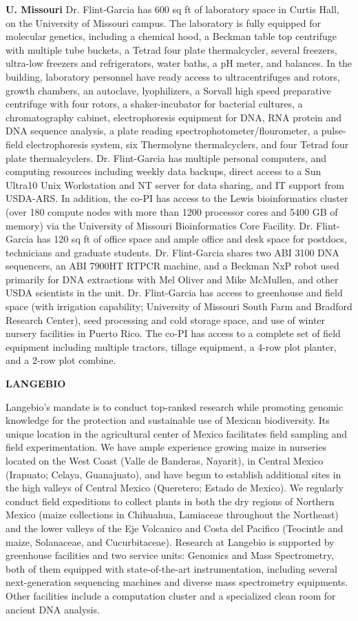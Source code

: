 \textbf{U. Missouri}
Dr. Flint-Garcia has 600 sq ft of laboratory space in Curtis Hall, on the University of Missouri campus.  The laboratory is fully equipped for molecular genetics, including a chemical hood, a Beckman table top centrifuge with multiple tube buckets, a Tetrad four plate thermalcycler, several freezers, ultra-low freezers and refrigerators, water baths, a pH meter, and balances.  In the building, laboratory personnel have ready access to ultracentrifuges and rotors, growth chambers, an autoclave, lyophilizers, a Sorvall high speed preparative centrifuge with four rotors, a shaker-incubator for bacterial cultures, a chromatography cabinet, electrophoresis equipment for DNA, RNA protein and DNA sequence analysis, a plate reading spectrophotometer/flourometer, a pulse-field electrophoresis system, six Thermolyne thermalcyclers, and four Tetrad four plate thermalcyclers. Dr. Flint-Garcia has multiple personal computers, and computing resources including weekly data backups, direct access to a Sun Ultra10 Unix Workstation and NT server for data sharing, and IT support from USDA-ARS.  In addition, the co-PI has access to the Lewis bioinformatics cluster (over 180 compute nodes with more than 1200 processor cores and 5400 GB of memory) via the University of Missouri Bioinformatics Core Facility. Dr. Flint-Garcia has 120 sq ft of office space and ample office and desk space for postdocs, technicians and graduate students. Dr. Flint-Garcia shares two ABI 3100 DNA sequencers, an ABI 7900HT RTPCR machine, and a Beckman NxP robot used primarily for DNA extractions with Mel Oliver and Mike McMullen, and other USDA scientists in the unit. Dr. Flint-Garcia has access to greenhouse and field space (with irrigation capability; University of Missouri South Farm and Bradford Research Center), seed processing and cold storage space, and use of winter nursery facilities in Puerto Rico. The co-PI has access to a complete set of field equipment including multiple tractors, tillage equipment, a 4-row plot planter, and a 2-row plot combine. 

\textbf{LANGEBIO} %

Langebio’s mandate is to conduct top-ranked research while promoting genomic knowledge for the protection and sustainable use of Mexican biodiversity. Its unique location in the agricultural center of Mexico facilitates field sampling and field experimentation. We have ample experience growing maize in nurseries located on the West Coast (Valle de Banderas, Nayarit), in Central Mexico (Irapuato; Celaya, Guanajuato), and have begun to establish additional sites in the high valleys of Central Mexico (Queretero; Estado de Mexico). We regularly conduct field expeditions to collect plants in both the dry regions of Northern Mexico (maize collections in Chihuahua, Lamiaceae throughout the Northeast) and the lower valleys of the Eje Volcanico and Costa del Pacifico (Teocintle and maize, Solanaceae, and Cucurbitaceae). Research at Langebio is supported by greenhouse facilities and two service units: Genomics and Mass Spectrometry, both of them equipped with state-of-the-art instrumentation, including several next-generation sequencing machines and diverse mass spectrometry equipments. Other facilities include a computation cluster and a specialized clean room for ancient DNA analysis.
